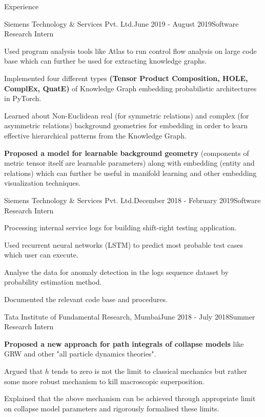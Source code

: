 \documentclass{resume} %
\begin{document}
\newpage
\begin{rSection}{Experience}


\begin{rSubsection}{Siemens Technology \& Services Pvt. Ltd.}{June 2019 - August 2019}{Software Research Intern}{}
\item Used program analysis tools like Atlas to run control flow analysis on large code base which can further be used for extracting knowledge graphs.
\item Implemented four different types \textbf{(Tensor Product Composition, HOLE, ComplEx, QuatE)} of Knowledge Graph embedding probabilistic architectures in PyTorch.
\item Learned about Non-Euclidean real (for symmetric relations) and complex (for asymmetric relations) background geometries for embedding in order to learn effective hierarchical patterns from the Knowledge Graph.
\item \textbf{Proposed a model for learnable background geometry} (components of metric tensor itself are learnable parameters) along with embedding (entity and relations) which can further be useful in manifold learning and other embedding visualization techniques. 
\end{rSubsection}

\begin{rSubsection}{Siemens Technology \& Services Pvt. Ltd.}{December 2018 - February 2019}{Software Research Intern}{}
\item Processing internal service logs for building shift-right testing application.
\item Used recurrent neural networks (LSTM) to predict most probable test cases which user can execute.
\item Analyse the data for anomaly detection in the logs sequence dataset by probability estimation method.
\item Documented the relevant code base and procedures.
\end{rSubsection}

\begin{rSubsection}{Tata Institute of Fundamental Research, Mumbai}{June 2018 - July 2018}{Summer Research Intern}{}
\item  \textbf{Proposed a new approach for path integrals of collapse models} like GRW and other "all particle dynamics theories".
\item Argued that $h$ tends to zero is not the limit to classical mechanics but rather some more robust mechanism to kill macroscopic superposition.
\item Explained that the above mechanism can be achieved through appropriate limit on collapse model parameters and rigorously formalised these limits.
\end{rSubsection}

\end{rSection}
\end{document}
